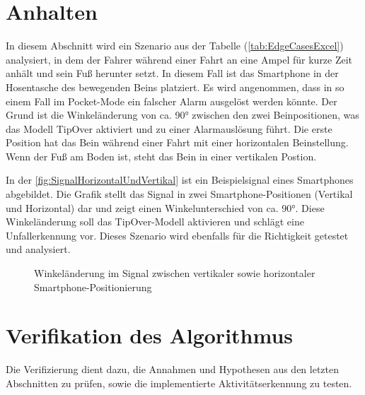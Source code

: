 




\section{Anhalten} \label{sec:AmpelStehen}
In diesem Abschnitt wird ein Szenario aus der Tabelle (\autoref{tab:EdgeCasesExcel}) analysiert, in dem der Fahrer während einer Fahrt an eine Ampel für kurze Zeit anhält und sein Fuß herunter setzt. In diesem Fall ist das Smartphone in der Hosentasche des bewegenden Beins platziert.
Es wird angenommen, dass in so einem Fall im Pocket-Mode ein falscher Alarm ausgelöst werden könnte. Der Grund ist die Winkeländerung von ca. \ang{90} zwischen den zwei Beinpositionen, was das Modell \glqq TipOver\grqq{} aktiviert und zu einer Alarmauslösung führt.
Die erste Position hat das Bein während einer Fahrt mit einer horizontalen Beinstellung. Wenn der Fuß am Boden ist, steht das Bein in einer vertikalen Postion.

In der \autoref{fig:SignalHorizontalUndVertikal} ist ein Beispielsignal eines Smartphones abgebildet. Die Grafik stellt das Signal in zwei Smartphone-Positionen (Vertikal und Horizontal) dar und zeigt einen Winkelunterschied von ca. \ang{90}. Diese Winkeländerung soll das \glqq TipOver\grqq{}-Modell aktivieren und schlägt eine Unfallerkennung vor.
Dieses Szenario wird ebenfalls für die Richtigkeit getestet und analysiert.

\begin{figure}
	\centering
	\caption{Winkeländerung im Signal zwischen vertikaler sowie horizontaler Smartphone-Positionierung}
	\label{fig:SignalHorizontalUndVertikal}
\end{figure}



\section{Verifikation des Algorithmus}
Die Verifizierung dient dazu, die Annahmen und Hypothesen aus den letzten Abschnitten zu prüfen, sowie die implementierte Aktivitätserkennung zu testen.


